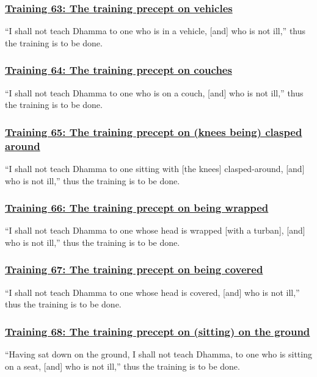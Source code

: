 \subsubsection*{\hyperref[sekh63]{Training 63: The training precept on vehicles}}
\label{training63}
``I shall not teach Dhamma to one who is in a vehicle, [and] who is not ill,'' thus the training is to be done.

\subsubsection*{\hyperref[sekh64]{Training 64: The training precept on couches}}
\label{training64}
``I shall not teach Dhamma to one who is on a couch, [and] who is not ill,'' thus the training is to be done.

\subsubsection*{\hyperref[sekh65]{Training 65: The training precept on (knees being) clasped around}}
\label{training65}
``I shall not teach Dhamma to one sitting with [the knees] clasped-around, [and] who is not ill,'' thus the training is to be done.

\subsubsection*{\hyperref[sekh66]{Training 66: The training precept on being wrapped}}
\label{training66}
``I shall not teach Dhamma to one whose head is wrapped [with a turban], [and] who is not ill,'' thus the training is to be done.

\subsubsection*{\hyperref[sekh67]{Training 67: The training precept on being covered}}
\label{training67}
``I shall not teach Dhamma to one whose head is covered, [and] who is not ill,'' thus the training is to be done.

\subsubsection*{\hyperref[sekh68]{Training 68: The training precept on (sitting) on the ground}}
\label{training68}
``Having sat down on the ground, I shall not teach Dhamma, to one who is sitting on a seat, [and] who is not ill,'' thus the training is to be done.

